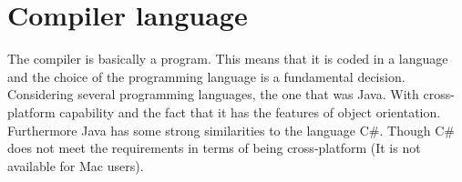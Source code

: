 \section{Compiler language}
The compiler is basically a program. This means that it is coded in a language and the choice of the programming language is a fundamental decision. Considering several programming languages, the one that was Java. With cross-platform capability\cite{java:requirements} and the fact that it has the features of object orientation\cite{java:object:orientation}. Furthermore Java has some strong similarities to the language C\#\cite{java:comparison}. Though C\# does not meet the requirements in terms of being cross-platform (It is not available for Mac users). 
